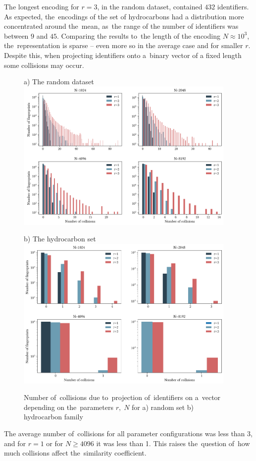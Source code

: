 The longest encoding for \( r=3 \), in the random dataset, contained \( 432 \) identifiers. As expected, the~encodings of the set of hydrocarbons had a distribution more concentrated around the~mean, as~the range of the number of identifiers was between \( 9 \) and \( 45 \). Comparing the results to~the length of the encoding \( N \approx 10^3 \), the~representation is sparse -- even more so in the average case and for smaller \( r \). Despite this, when projecting identifiers onto a~binary vector of a fixed length some collisions may occur.
\begin{figure}[H]
    \centering
    a) The random dataset
    \includegraphics[width=0.95\textwidth]{figures/num_collisions.png}
\end{figure}
\begin{figure}[H]
    \centering
    b) The hydrocarbon set
    \includegraphics[width=0.95\textwidth]{figures/num_collisions_c22.png}
    \caption{Number of~collisions due to~projection of~identifiers on a~vector depending on the~parameters \( r,\; N \) for a) random set b) hydrocarbon family}
    \label{fig:num_collisions}
\end{figure}
The average number of~collisions for all parameter configurations was less than 3, and for \( r=1 \) or for \( N \geq 4096 \) it was less than 1. This raises the~question of~how much collisions affect the~similarity coefficient.